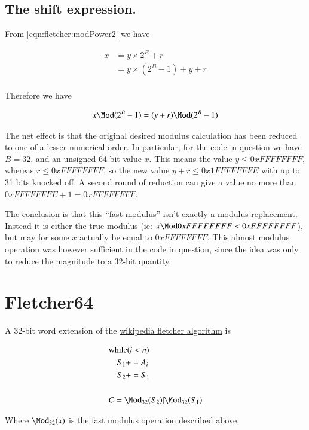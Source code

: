 \subsection{The shift expression. }

From \ref{eqn:fletcher:modPower2} we have

\begin{align*}
x 
&= y \times 2^B + r \\
&= y \times (2^B -1) + y + r \\
\end{align*}

Therefore we have

\begin{align*}
x \Mod (2^B -1) &= (y + r) \Mod (2^B -1) \\
\end{align*}

The net effect is that the original desired modulus calculation has been reduced to one of a lesser numerical order.  In particular, for the
code in question we have $B=32$, and an unsigned 64-bit value $x$.  This means the value $y \le 0xFFFFFFFF$, whereas $r \le 0xFFFFFFFF$, so the new value
$y + r \le 0x1FFFFFFFE$ with up to 31 bits knocked off.  A second round of reduction can give a value no more than $0xFFFFFFFE + 1 = 0xFFFFFFFF$.

The conclusion is that this ``fast modulus'' isn't exactly a modulus replacement.  Instead it is either the true modulus (ie: $x \Mod 0xFFFFFFFF < 0xFFFFFFFF$), but may for some $x$ actually be equal to $0xFFFFFFFF$.  This almost modulus operation was however sufficient in the code in question, since the idea was only to reduce the magnitude to a 32-bit quantity.

\section{Fletcher64 }

A 32-bit word extension of the \href{http://en.wikipedia.org/wiki/Fletcher%27s_checksum}{wikipedia fletcher algorithm} is

\begin{align*}
&\text{while} ( i < n )  \\
&\quad   S_1 += A_i \\
&\quad   S_2 += S_1 \\
\\
&C = \Mod_{32}(S_2) | \Mod_{32}(S_1)
\end{align*}

Where $\Mod_{32}(x)$ is the fast modulus operation described above.

